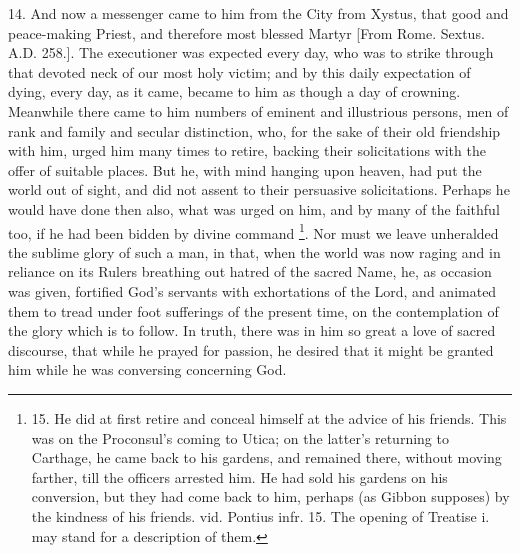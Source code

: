 14. And now a messenger came
to him from the City from Xystus, that good and peace-making Priest,
and therefore most blessed Martyr [From Rome. Sextus. A.D. 258.]. The
executioner was expected every day, who was to strike through that
devoted neck of our most holy victim; and by this daily expectation of
dying, every day, as it came, became to him as though a day of
crowning. Meanwhile there came to him numbers of eminent and
illustrious persons, men of rank and family and secular distinction,
who, for the sake of their old friendship with him, urged him many
times to retire, backing their solicitations with the offer of
suitable places. But he, with mind hanging upon heaven, had put the
world out of sight, and did not assent to their persuasive
solicitations. Perhaps he would have done then also, what was urged on
him, and by many of the faithful too, if he had been bidden by divine
command \footnote{15. He
did at first retire and conceal himself at the advice of his friends.
This was on the Proconsul's coming to Utica; on the latter's returning
to Carthage, he came back to his gardens, and remained there, without
moving farther, till the officers arrested him. He had sold his
gardens on his conversion, but they had come back to him, perhaps (as
Gibbon supposes) by the kindness of his friends. vid. Pontius infr.
15. The opening of Treatise i. may stand for a description of them.}. Nor must we
leave unheralded the sublime glory of such a man, in that, when the
world was now raging and in reliance on its Rulers breathing out
hatred of the sacred Name, he, as occasion was given, fortified God's
servants with exhortations of the Lord, and animated them to tread
under foot sufferings of the present time, on the contemplation of the
glory which is to follow. In truth, there was in him so great a love
of sacred discourse, that while he prayed for passion, he desired that
it might be granted him while he was conversing concerning God.

